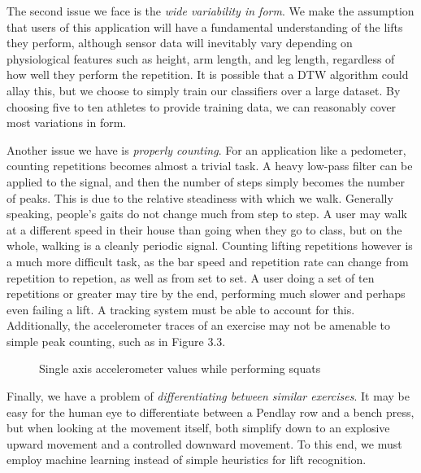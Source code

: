The second issue we face is the \textit{wide variability in form}. We make the assumption that users of this application will have a fundamental understanding of the lifts they perform, although sensor data will inevitably vary depending on physiological features such as height, arm length, and leg length, regardless of how well they perform the repetition. It is possible that a DTW algorithm could allay this, but we choose to simply train our classifiers over a large dataset. By choosing five to ten athletes to provide training data, we can reasonably cover most variations in form. 

Another issue we have is \textit{properly counting}. For an application like a pedometer, counting repetitions becomes almost a trivial task. A heavy low-pass filter can be applied to the signal, and then the number of steps simply becomes the number of peaks. This is due to the relative steadiness with which we walk. Generally speaking, people's gaits do not change much from step to step. A user may walk at a different speed in their house than going when they go to class, but on the whole, walking is a cleanly periodic signal. Counting lifting repetitions however is a much more difficult task, as the bar speed and repetition rate can change from repetition to repetion, as well as from set to set. A user doing a set of ten repetitions or greater may tire by the end, performing much slower and perhaps even failing a lift. A tracking system must be able to account for this. Additionally, the accelerometer traces of an exercise may not be amenable to simple peak counting, such as in Figure 3.3.

\begin{figure}
    \centering
    \caption{Single axis accelerometer values while performing squats}
\end{figure}

Finally, we have a problem of \textit{differentiating between similar exercises}. It may be easy for the human eye to differentiate between a Pendlay row and a bench press, but when looking at the movement itself, both simplify down to an explosive upward movement and a controlled downward movement. To this end, we must employ machine learning instead of simple heuristics for lift recognition. 

